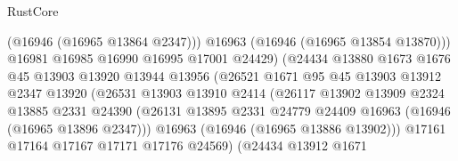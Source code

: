 \begin{lexlean}{RustCore}
\begin{coremodule}
                                        (@16946 (@16965 @13864 @2347)))
                                      @16963
                                      (@16946 (@16965 @13854 @13870)))
                                    @16981
                                    @16985
                                    @16990
                                    @16995
                                    @17001
                                    @24429)
                                  (@24434
                                    @13880
                                    @1673
                                    @1676
                                    @45
                                    @13903
                                    @13920
                                    @13944
                                    @13956
                                    (@26521
                                      @1671
                                      @95
                                      @45
                                      @13903
                                      @13912
                                      @2347
                                      @13920
                                      (@26531
                                        @13903
                                        @13910
                                        @2414
                                        (@26117
                                          @13902
                                          @13909
                                          @2324
                                          @13885
                                          @2331
                                          @24390
                                          (@26131
                                            @13895
                                            @2331
                                            @24779
                                            @24409
                                            @16963
                                            (@16946 (@16965 @13896 @2347)))
                                          @16963
                                          (@16946 (@16965 @13886 @13902)))
                                        @17161
                                        @17164
                                        @17167
                                        @17171
                                        @17176
                                        @24569)
                                      (@24434
                                        @13912
                                        @1671

\end{coremodule}
\end{lexlean}
